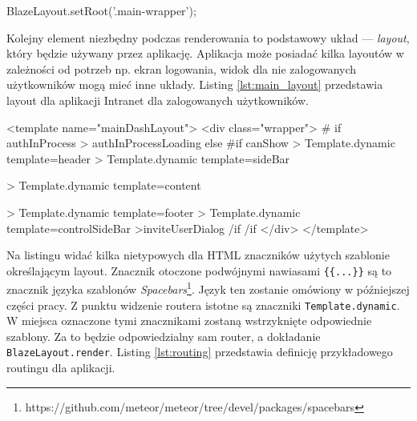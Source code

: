 \begin{js}[caption={Wskazanie elementu do renderowania szablonów},label={lst:blaze_layout}]
BlazeLayout.setRoot('.main-wrapper');
\end{js}
Kolejny element niezbędny podczas renderowania to podstawowy układ --- \textit{layout}, który będzie używany przez aplikację. Aplikacja może posiadać kilka layoutów w zależności od potrzeb np. ekran logowania, widok dla nie zalogowanych użytkowników mogą mieć inne układy. Listing \ref{lst:main_layout} przedstawia layout dla aplikacji Intranet dla zalogowanych użytkowników.
\begin{html}[caption={Główny layout dla aplikacji},label={lst:main_layout}]
<template name="mainDashLayout">
    <div class="wrapper">
        {{# if authInProcess }}
            {{> authInProcessLoading}}
        {{else}}
            {{#if canShow }}
                    {{> Template.dynamic template=header}}
                    {{> Template.dynamic template=sideBar}}

                    {{> Template.dynamic template=content}}

                    {{> Template.dynamic template=footer}}
                    {{> Template.dynamic template=controlSideBar}}
                    {{>inviteUserDialog}}
            {{/if}}
        {{/if}}
    </div>
</template>
\end{html}
Na listingu widać kilka nietypowych dla HTML znaczników użytych szablonie określającym layout. Znacznik otoczone podwójnymi nawiasami \verb|{{...}}| są to znacznik języka szablonów \emph{Spacebars}\footnote{https://github.com/meteor/meteor/tree/devel/packages/spacebars}. Język ten zostanie omówiony w późniejszej części pracy. Z punktu widzenie routera istotne są znaczniki \verb|Template.dynamic|. W miejsca oznaczone tymi znacznikami zostaną wstrzyknięte odpowiednie szablony. Za to będzie odpowiedzialny sam router, a dokładanie \verb|BlazeLayout.render|. Listing \ref{lst:routing} przedstawia definicję przykładowego routingu dla aplikacji.
